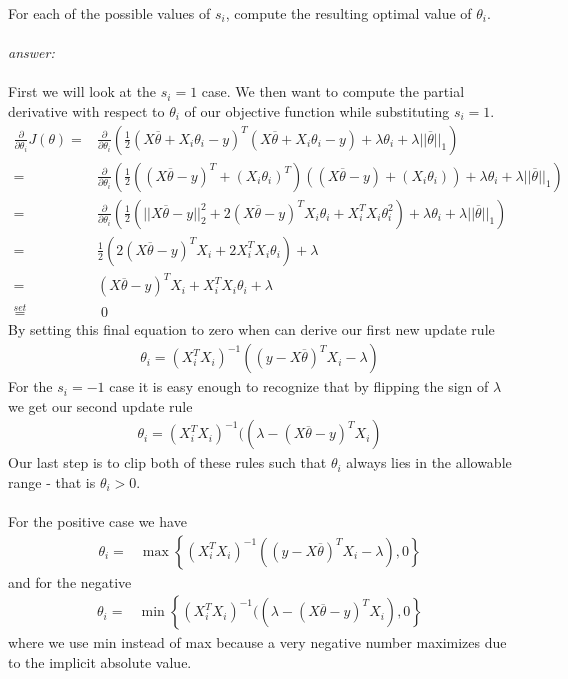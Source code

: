 \documentclass{article}
\begin{document}
\begin{enumerate}[label=(\alph*)]
    For each of the possible values of $s_i$, compute the resulting optimal value of $\theta_i$.\\\\
    \textit{answer:}\\\\
    First we will look at the $s_i = 1$ case. We then want to compute the partial derivative with respect to $\theta_i$ of our objective function while substituting $s_i = 1$.
    \begin{align*}
        \frac{\partial}{\partial\theta_i}J(\theta) =&{}  \frac{\partial}{\partial\theta_i}\left(\frac{1}{2}(X\overline{\theta} + X_i\theta_i - y)^T(X\overline{\theta} + X_i\theta_i - y) + \lambda\theta_i + \lambda||\overline{\theta}||_1\right)\\
        =&{} \frac{\partial}{\partial\theta_i}\left(\frac{1}{2}((X\overline{\theta} - y)^T + (X_i\theta_i)^T)((X\overline{\theta} - y) + (X_i\theta_i)) + \lambda\theta_i + \lambda||\overline{\theta}||_1\right)\\
        =&{} \frac{\partial}{\partial\theta_i}\left(\frac{1}{2}(||X\overline{\theta} - y||_2^2 + 2(X\overline{\theta} - y)^TX_i\theta_i + X_i^TX_i\theta_i^2) + \lambda\theta_i + \lambda||\overline{\theta}||_1\right)\\
        =&{} \frac{1}{2}(2(X\overline{\theta} - y)^TX_i + 2X_i^TX_i\theta_i) + \lambda\\
        =&{} (X\overline{\theta} - y)^TX_i + X_i^TX_i\theta_i + \lambda\\
        \overset{set}{=}&{}\; 0
    \end{align*}
    By setting this final equation to zero when can derive our first new update rule
    \begin{align*}
        \theta_i = (X_i^TX_i)^{-1}((y-X\overline{\theta})^TX_i - \lambda)
    \end{align*}
    For the $s_i = -1$ case it is easy enough to recognize that by flipping the sign of $\lambda$ we get our second update rule
    \begin{align*}
        \theta_i = (X_i^TX_i)^{-1}((\lambda - (X\overline{\theta}-y)^TX_i)
    \end{align*}
    Our last step is to clip both of these rules such that $\theta_i$ always lies in the allowable range - that is $\theta_i > 0$.\\\\
    For the positive case we have
    \begin{align*}
        \theta_i =&{} \max\left\{(X_i^TX_i)^{-1}((y-X\overline{\theta})^TX_i - \lambda),0\right\}
    \end{align*}
    and for the negative
    \begin{align*}
        \theta_i =&{} \min\left\{(X_i^TX_i)^{-1}((\lambda - (X\overline{\theta}-y)^TX_i),0\right\}
    \end{align*}
    where we use min instead of max because a very negative number maximizes due to the implicit absolute value.
\end{enumerate}
\end{document}
